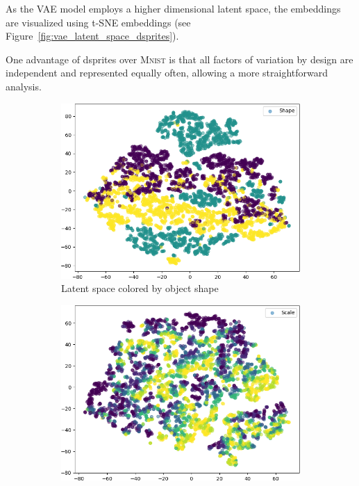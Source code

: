 As the \ac{VAE} model employs a higher dimensional latent space, the embeddings are visualized using \ac{t-SNE} embeddings (see Figure~\ref{fig:vae_latent_space_dsprites}).

One advantage of dsprites over \textsc{Mnist} is that all factors of variation by design are independent and represented equally often, allowing a more straightforward analysis.

\begin{figure}
    \centering
    \begin{adjustbox}{valign=T}
        \begin{subfigure}{.19\textwidth}
            \includegraphics[width=\textwidth]{images/latent_spaces/dsprites/vae/embeddings_mu_0.png}
            \caption{Latent space colored by object shape}
        \end{subfigure}
    \end{adjustbox}
    \hfill
    \begin{adjustbox}{valign=T}
        \begin{subfigure}{.19\textwidth}
            \includegraphics[width=\textwidth]{images/latent_spaces/dsprites/vae/embeddings_mu_1.png}

\end{subfigure}
\end{adjustbox}
\end{figure}
